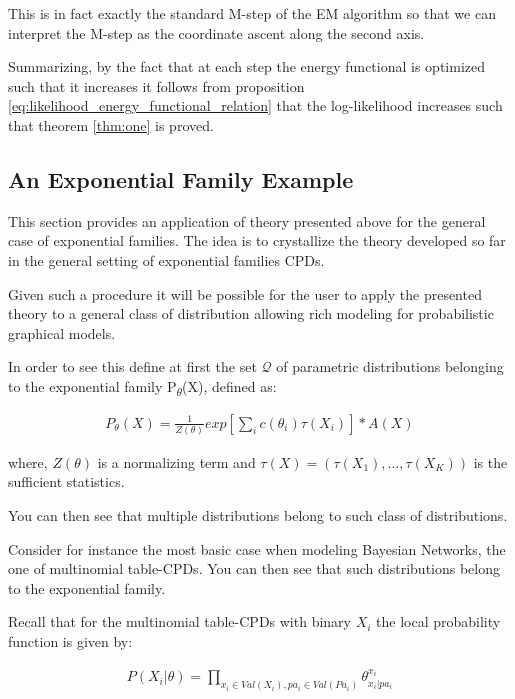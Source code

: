 \documentclass[11pt]{article}
\begin{document}
\begin{article}
This is in fact exactly the standard M-step of the EM algorithm so
that we can interpret the M-step as the coordinate ascent along
the second axis. 

Summarizing, by the fact that at each step the energy functional is
optimized such that it increases it follows from proposition
\ref{eq:likelihood_energy_functional_relation} that the
log-likelihood increases such that theorem \ref{thm:one} is proved.

\subsection{An Exponential Family Example}
\label{sec:org3ff818e}

This section provides an application of theory presented above for
the general case of exponential families. The idea is to
crystallize the theory developed so far in the general setting of
exponential families CPDs.

Given such a procedure it will be possible for the user to apply
the presented theory to a general class of distribution allowing
rich modeling for probabilistic graphical models.

In order to see this define at first the set \(\mathscr{Q}\) of
parametric distributions belonging to the exponential family
P\textsubscript{\(\theta\)}(X), defined as:

\begin{align} \label{eq:exponential-family}
P_{\theta}(X) = \frac{1}{Z(\theta)} exp[\sum_i c(\theta_i)\tau(X_i)] * A(X)
\end{align}

where, \(Z(\theta)\) is a normalizing term and \(\tau(X) = (\tau(X_1),
    ..., \tau(X_K))\) is the sufficient statistics.

You can then see that multiple distributions belong to such class
of distributions.

Consider for instance the most basic case when modeling Bayesian
Networks, the one of multinomial table-CPDs. You can then see that
such distributions belong to the exponential family.

Recall that for the multinomial table-CPDs with binary \(X_i\) the
local probability function is given by:

\begin{align} \label{eq:multinomial-cpd}
P(X_i|\theta) = \prod_{x_i \in Val(X_i), pa_i \in Val(Pa_i)} \theta_{x_i | pa_i}^{x_i}
\end{align}


\end{article}
\end{document}
